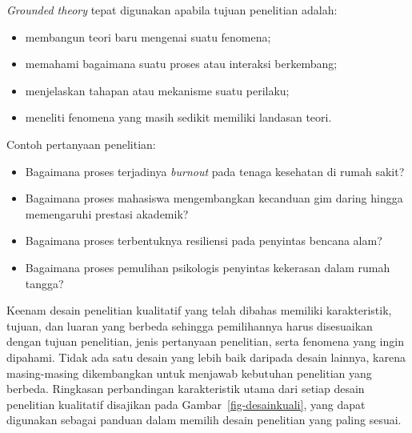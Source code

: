\documentclass[
  indonesian,
  letterpaper,
  DIV=11,
  numbers=noendperiod]{scrreprt}
\providecommand{\tightlist}{%
  \setlength{\itemsep}{0pt}\setlength{\parskip}{0pt}}
\begin{document}
\begin{tcolorbox}[enhanced jigsaw, colframe=quarto-callout-tip-color-frame, toptitle=1mm, breakable, leftrule=.75mm, arc=.35mm, toprule=.15mm, colback=white, colbacktitle=quarto-callout-tip-color!10!white, bottomtitle=1mm, bottomrule=.15mm, titlerule=0mm, title={Kapan menggunakan \emph{grounded theory}?}, coltitle=black, left=2mm, opacitybacktitle=0.6, opacityback=0, rightrule=.15mm]

\emph{Grounded theory} tepat digunakan apabila tujuan penelitian adalah:

\begin{itemize}
\tightlist
\item
  membangun teori baru mengenai suatu fenomena;
\item
  memahami bagaimana suatu proses atau interaksi berkembang;
\item
  menjelaskan tahapan atau mekanisme suatu perilaku;
\item
  meneliti fenomena yang masih sedikit memiliki landasan teori.
\end{itemize}

Contoh pertanyaan penelitian:

\begin{itemize}
\tightlist
\item
  Bagaimana proses terjadinya \emph{burnout} pada tenaga kesehatan di
  rumah sakit?
\item
  Bagaimana proses mahasiswa mengembangkan kecanduan gim daring hingga
  memengaruhi prestasi akademik?
\item
  Bagaimana proses terbentuknya resiliensi pada penyintas bencana alam?
\item
  Bagaimana proses pemulihan psikologis penyintas kekerasan dalam rumah
  tangga?
\end{itemize}

\end{tcolorbox}

Keenam desain penelitian kualitatif yang telah dibahas memiliki
karakteristik, tujuan, dan luaran yang berbeda sehingga pemilihannya
harus disesuaikan dengan tujuan penelitian, jenis pertanyaan penelitian,
serta fenomena yang ingin dipahami. Tidak ada satu desain yang lebih
baik daripada desain lainnya, karena masing-masing dikembangkan untuk
menjawab kebutuhan penelitian yang berbeda. Ringkasan perbandingan
karakteristik utama dari setiap desain penelitian kualitatif disajikan
pada Gambar~\ref{fig-desainkuali}, yang dapat digunakan sebagai panduan
dalam memilih desain penelitian yang paling sesuai.
\end{document}
